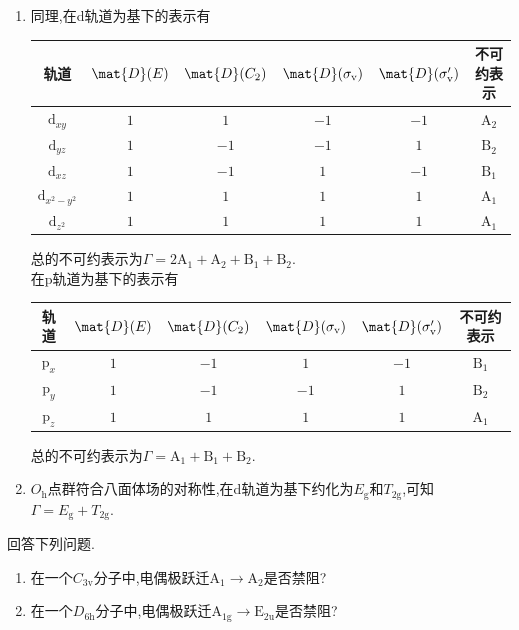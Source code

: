 \documentclass{ctexart}
\begin{document}
\begin{solution}
\begin{enumerate}[label=\tbf{(\alph*)}]
    \item 同理,在d轨道为基下的表示有
    \begin{table}[H]\centering
        \begin{tabular}{|c|c|c|c|c|c|}\hline
            轨道 & $\mat{D}(E)$ & $\mat{D}(C_2)$ & $\mat{D}(\sigma_\text{v})$ & $\mat{D}(\sigma_\text{v}')$ & 不可约表示 \\\hline
            $\text{d}_{xy}$ & $1$ & $1$ & $-1$ & $-1$ & $\text{A}_2$ \\\hline
            $\text{d}_{yz}$ & $1$ & $-1$ & $-1$ & $1$ & $\text{B}_2$ \\\hline
            $\text{d}_{xz}$ & $1$ & $-1$ & $1$ & $-1$ & $\text{B}_1$ \\\hline
            $\text{d}_{x^2-y^2}$ & $1$ & $1$ & $1$ & $1$ & $\text{A}_1$ \\\hline
            $\text{d}_{z^2}$ & $1$ & $1$ & $1$ & $1$ & $\text{A}_1$ \\\hline
        \end{tabular}
    \end{table}
    总的不可约表示为$\Gamma=2\text{A}_1+\text{A}_2+\text{B}_1+\text{B}_2$.\\
    在p轨道为基下的表示有
    \begin{table}[H]\centering
        \begin{tabular}{|c|c|c|c|c|c|}\hline
            轨道 & $\mat{D}(E)$ & $\mat{D}(C_2)$ & $\mat{D}(\sigma_\text{v})$ & $\mat{D}(\sigma_\text{v}')$ & 不可约表示 \\\hline
            $\text{p}_{x}$ & $1$ & $-1$ & $1$ & $-1$ & $\text{B}_1$ \\\hline
            $\text{p}_{y}$ & $1$ & $-1$ & $-1$ & $1$ & $\text{B}_2$ \\\hline
            $\text{p}_{z}$ & $1$ & $1$ & $1$ & $1$ & $\text{A}_1$ \\\hline
        \end{tabular}
    \end{table}
    总的不可约表示为$\Gamma=\text{A}_1+\text{B}_1+\text{B}_2$.
    \item $O_\text{h}$点群符合八面体场的对称性,在d轨道为基下约化为$E_\text{g}$和$T_{2\text{g}}$,可知$\Gamma=E_\text{g}+T_{2\text{g}}$.
\end{enumerate}
\end{solution}
\begin{homework}[11.]
    回答下列问题.
    \begin{enumerate}[label=\tbf{(\alph*)}]
        \item 在一个$C_{3\text{v}}$分子中,电偶极跃迁$\text{A}_1\to\text{A}_2$是否禁阻?
        \item 在一个$D_{6\text{h}}$分子中,电偶极跃迁$\text{A}_{1\text{g}}\to\text{E}_{2\text{u}}$是否禁阻?
    \end{enumerate}
\end{homework}
\end{document}
